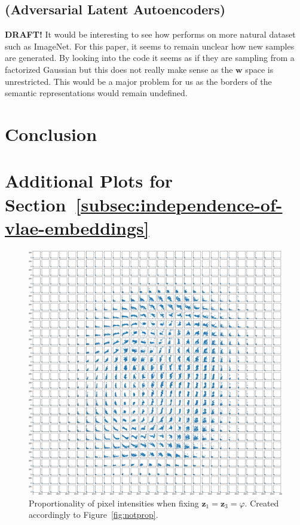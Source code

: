 \documentclass[11pt]{article}
\begin{document}
\subsection{\citet{pidhorskyi2020adversarial} (Adversarial Latent Autoencoders)}
\textbf{DRAFT!}
It would be interesting to see how \citet{pidhorskyi2020adversarial} performs on more natural dataset such as ImageNet.
For this paper, it seems to remain unclear how new samples are generated.
By looking into the code it seems as if they are sampling from a factorized Gaussian but this does not really make sense as the $\bm{w}$ space is unrestricted.
This would be a major problem for us as the borders of the semantic representations would remain undefined.

\section{Conclusion}\label{sec:conclusion}

\newpage
\printbibliography

\newpage
\appendix
\section{Additional Plots for Section~\ref{subsec:independence-of-vlae-embeddings}}\label{sec:additional-plots-for-section_independence}
\begin{figure}[H]
\centering
\includegraphics[width=\textwidth]{images/appendix_plots/notprop_1_3.png}
\caption{Proportionality of pixel intensities when fixing $\bm{z}_1 = \bm{z}_3=\varphi$. Created accordingly to Figure~\ref{fig:notprop}.}
\label{fig:notprop_1_3}
\end{figure}
\end{document}
